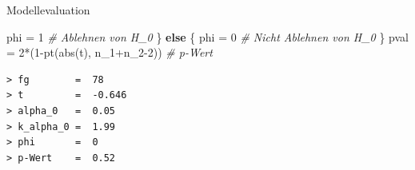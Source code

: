 \documentclass[
  8pt,
  ignorenonframetext,
]{beamer}
\newenvironment{Shaded}{\begin{snugshade}}{\end{snugshade}}
\newcommand{\CommentTok}[1]{\textcolor[rgb]{0.56,0.35,0.01}{\textit{#1}}}
\newcommand{\ControlFlowTok}[1]{\textcolor[rgb]{0.13,0.29,0.53}{\textbf{#1}}}
\newcommand{\DecValTok}[1]{\textcolor[rgb]{0.00,0.00,0.81}{#1}}
\newcommand{\FunctionTok}[1]{\textcolor[rgb]{0.00,0.00,0.00}{#1}}
\newcommand{\NormalTok}[1]{#1}
\newcommand{\OtherTok}[1]{\textcolor[rgb]{0.56,0.35,0.01}{#1}}
\newcommand{\SpecialCharTok}[1]{\textcolor[rgb]{0.00,0.00,0.00}{#1}}
\begin{document}
\begin{frame}[fragile]{Modellevaluation}
\begin{Shaded}
\begin{Highlighting}[]
\NormalTok{    phi }\OtherTok{=} \DecValTok{1}                                                       \CommentTok{\# Ablehnen von H\_0}
\NormalTok{\} }\ControlFlowTok{else}\NormalTok{ \{}
\NormalTok{    phi }\OtherTok{=} \DecValTok{0}                                                       \CommentTok{\# Nicht Ablehnen von H\_0}
\NormalTok{\}}
\NormalTok{pval      }\OtherTok{=} \DecValTok{2}\SpecialCharTok{*}\NormalTok{(}\DecValTok{1}\SpecialCharTok{{-}}\FunctionTok{pt}\NormalTok{(}\FunctionTok{abs}\NormalTok{(t), n\_1}\SpecialCharTok{+}\NormalTok{n\_2}\DecValTok{{-}2}\NormalTok{))                           }\CommentTok{\# p{-}Wert}
\end{Highlighting}
\end{Shaded}

\vspace{-1mm}

\begin{verbatim}
> fg        =  78 
> t         =  -0.646 
> alpha_0   =  0.05 
> k_alpha_0 =  1.99 
> phi       =  0 
> p-Wert    =  0.52
\end{verbatim}
\end{frame}
\end{document}
